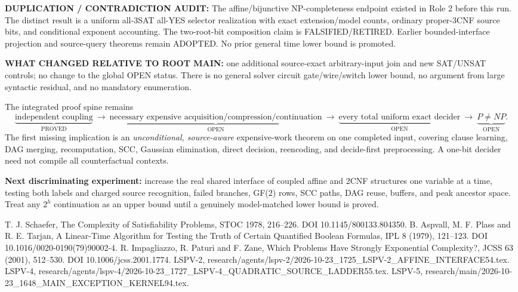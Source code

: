 \documentclass[11pt]{article}
\begin{document}
\noindent\textbf{DUPLICATION / CONTRADICTION AUDIT:} The affine/bijunctive NP-completeness endpoint existed in Role 2 before this run. The distinct result is a uniform all-3SAT all-YES selector realization with exact extension/model counts, ordinary proper-3CNF source bits, and conditional exponent accounting. The two-root-bit composition claim is FALSIFIED/RETIRED. Earlier bounded-interface projection and source-query theorems remain ADOPTED. No prior general time lower bound is promoted.

\noindent\textbf{WHAT CHANGED RELATIVE TO ROOT MAIN:} one additional source-exact arbitrary-input join and new SAT/UNSAT controls; no change to the global OPEN status. There is no general solver circuit gate/wire/switch lower bound, no argument from large syntactic residual, and no mandatory enumeration.

The integrated proof spine remains
\[
\underbrace{\text{independent coupling}}_{\mathrm{PROVED}}
\ \longrightarrow\
\underbrace{\text{necessary expensive acquisition/compression/continuation}}_{\mathrm{OPEN}}
\ \longrightarrow\
\underbrace{\text{every total uniform exact decider}}_{\mathrm{OPEN}}
\ \longrightarrow\
\underbrace{P\ne NP}_{\mathrm{OPEN}}.
\]
The first missing implication is an \emph{unconditional, source-aware} expensive-work theorem on one completed input, covering clause learning, DAG merging, recomputation, SCC, Gaussian elimination, direct decision, reencoding, and decide-first preprocessing. A one-bit decider need not compile all counterfactual contexts.

\noindent\textbf{Next discriminating experiment:} increase the real shared interface of coupled affine and 2CNF structures one variable at a time, testing both labels and charged source recognition, failed branches, GF(2) rows, SCC paths, DAG reuse, buffers, and peak ancestor space. Treat any $2^h$ continuation as an upper bound until a genuinely model-matched lower bound is proved.

\begin{thebibliography}{9}
\bibitem{sch} T. J. Schaefer, The Complexity of Satisfiability Problems, STOC 1978, 216--226. DOI 10.1145/800133.804350.
 B. Aspvall, M. F. Plass and R. E. Tarjan, A Linear-Time Algorithm for Testing the Truth of Certain Quantified Boolean Formulas, IPL 8 (1979), 121--123. DOI 10.1016/0020-0190(79)90002-4.
\bibitem{ipz} R. Impagliazzo, R. Paturi and F. Zane, Which Problems Have Strongly Exponential Complexity?, JCSS 63 (2001), 512--530. DOI 10.1006/jcss.2001.1774.
\bibitem{peer2} LSPV-2, research/agents/lspv-2/2026-10-23_1725_LSPV-2_AFFINE_INTERFACE54.tex.
\bibitem{peer4} LSPV-4, research/agents/lspv-4/2026-10-23_1727_LSPV-4_QUADRATIC_SOURCE_LADDER55.tex.
\bibitem{main94} LSPV-5, research/main/2026-10-23_1648_MAIN_EXCEPTION_KERNEL94.tex.
\end{thebibliography}
\end{document}
